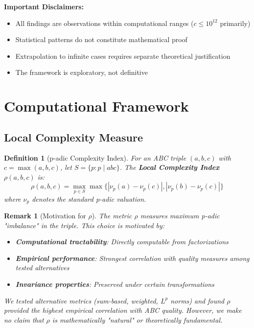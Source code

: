 \documentclass[11pt,a4paper]{article}
\newtheorem{definition}{Definition}[section]
\newtheorem{remark}{Remark}[section]
\begin{document}
\textbf{Important Disclaimers:}
\begin{itemize}
    \item All findings are observations within computational ranges ($c \leq 10^{12}$ primarily)
    \item Statistical patterns do not constitute mathematical proof
    \item Extrapolation to infinite cases requires separate theoretical justification
    \item The framework is exploratory, not definitive
\end{itemize}

\section{Computational Framework}

\subsection{Local Complexity Measure}

\begin{definition}[p-adic Complexity Index]
For an ABC triple $(a,b,c)$ with $c = \max(a,b,c)$, let $S=\{p : p \mid abc\}$. The \textbf{Local Complexity Index} $\rho(a,b,c)$ is:
\[
\rho(a,b,c) = \max_{p \in S} \max\{|\nu_p(a) - \nu_p(c)|, |\nu_p(b) - \nu_p(c)|\}
\]
where $\nu_p$ denotes the standard p-adic valuation.
\end{definition}

\begin{remark}[Motivation for $\rho$]
The metric $\rho$ measures maximum p-adic "imbalance" in the triple. This choice is motivated by:
\begin{itemize}
    \item \textbf{Computational tractability}: Directly computable from factorizations
    \item \textbf{Empirical performance}: Strongest correlation with quality measures among tested alternatives
    \item \textbf{Invariance properties}: Preserved under certain transformations
\end{itemize}

We tested alternative metrics (sum-based, weighted, $L^p$ norms) and found $\rho$ provided the highest empirical correlation with ABC quality. However, we make no claim that $\rho$ is mathematically "natural" or theoretically fundamental.
\end{remark}
\end{document}
